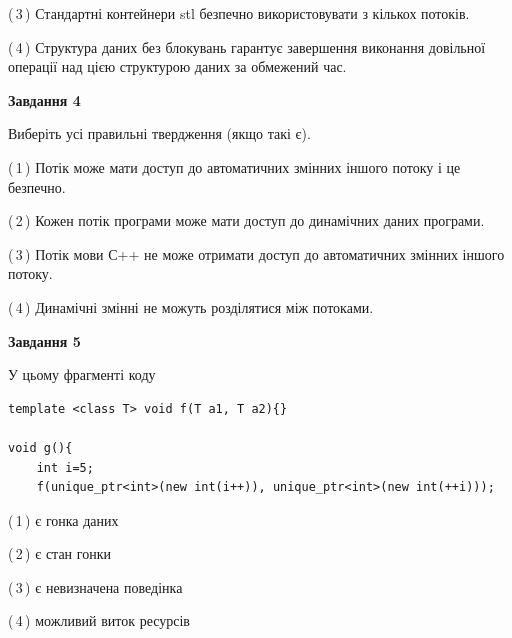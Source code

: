 \documentclass[12pt, ukrainian]{article}
\begin{document}
\begin {large}
{(\,3\,) Стандартні контейнери stl безпечно використовувати з кількох потоків.%

(\,4\,) Структура даних без блокувань гарантує завершення виконання довільної операції над цією структурою даних за обмежений час.%



\begin{center}
\textbf{Завдання 4}
\end{center}
Виберіть усі правильні твердження (якщо такі є).\par
\vspace{2mm}

(\,1\,) Потік може мати доступ до автоматичних змінних іншого потоку і це безпечно.%

(\,2\,) Кожен потік програми може мати доступ до динамічних даних програми.%

(\,3\,) Потік мови С++ не може отримати доступ до автоматичних змінних іншого потоку.%

(\,4\,) Динамічні змінні не можуть розділятися між потоками.%



\begin{center}
\textbf{Завдання 5}
\end{center}
У цьому фрагменті коду
\begin{verbatim}
template <class T> void f(T a1, T a2){}

void g(){
    int i=5;
    f(unique_ptr<int>(new int(i++)), unique_ptr<int>(new int(++i)));
\end{verbatim}

(\,1\,) є гонка даних%

(\,2\,) є стан гонки%

(\,3\,) є невизначена поведінка%

(\,4\,) можливий виток ресурсів%


}
\end {large}
\end{document}
